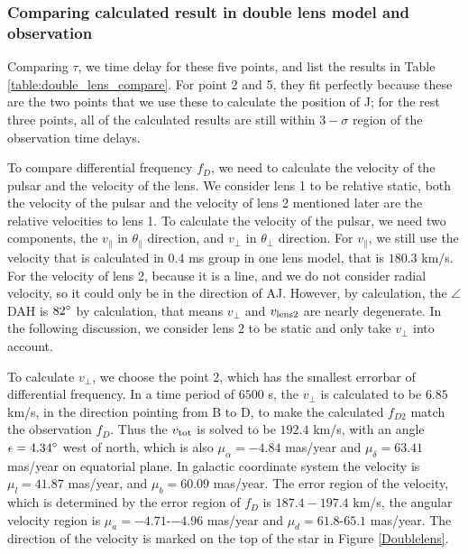 \documentclass[useAMS,usenatbib]{mn2e}
\begin{document}
\subsubsection{Comparing calculated result in double lens model and observation}
Comparing $\tau$, we time delay for these five points, and list the results in Table \ref{table:double_lens_compare}. For point 2 and 5, they fit perfectly because these are the two points that we use these to calculate the position of J; for the rest three points, all of the calculated results are still within $3-\sigma$ region of the observation time delays.

To compare differential frequency $f_D$, we need to calculate the velocity of the pulsar and the velocity of the lens. We consider lens 1 to be relative static, both the velocity of the pulsar and the velocity of lens 2 mentioned later are the relative velocities to lens 1.
To calculate the velocity of the pulsar, we need two components, the $v_{\parallel}$ in $\theta_{\parallel}$ direction, and $v_{\bot}$ in $\theta_{\bot}$ direction. For $v_{\parallel}$, we still use the velocity that is calculated in $0.4$ ms group in one lens model, that is $180.3$ km/s. For the velocity of lens 2, because it is a line, and we do not consider radial velocity, so it could only be in the direction of AJ. However, by calculation, the $\angle$DAH is $82\degree$ by calculation, that means $v_{\bot}$ and $v_{\rm lens2}$ are nearly degenerate. In the following discussion, we consider lens 2 to be static and only take $v_{\bot}$ into account.

To calculate $v_{\bot}$, we choose the point 2, which has the smallest errorbar of differential frequency. In a time period of $6500$ s, the $v_{\bot}$ is calculated to be $6.85$ km/s, in the direction pointing from B to D, to make the calculated $f_{D2}$ match the observation $f_D$. Thus the $v_{\rm tot}$ is solved to be $192.4$ km/s, with an angle $\epsilon=4.34\degree$ west of north, which is also $\mu_\alpha=-4.84$ mas/year and $\mu_\delta=63.41$ mas/year on equatorial plane. In galactic coordinate system the velocity is $\mu_l=41.87$ mas/year, and $\mu_b=60.09$ mas/year. %
The error region of the velocity, which is determined by the error region of $f_D$ is $187.4-197.4$ km/s, the angular velocity region is $\mu_a=-4.71$-$-4.96$ mas/year and $\mu_d=61.8$-$65.1$ mas/year. The direction of the velocity is marked on the top of the star in Figure \ref{Doublelens}.
\end{document}
